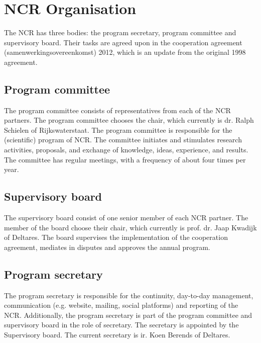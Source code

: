 \chapter{NCR Organisation}
	The NCR has three bodies: the program secretary, program committee and supervisory board. Their tasks are agreed upon in the cooperation agreement (samenwerkingsovereenkomst) 2012, which is an update from the original 1998 agreement. 
    
    \section{Program committee}
    The program committee consists of representatives from each of the NCR partners. The program committee chooses the chair, which currently is dr. Ralph Schielen of Rijkswaterstaat. The program committee is responsible for the (scientific) program of NCR. The committee initiates and stimulates research activities, proposals, and exchange of knowledge, ideas, experience, and results. The committee has regular meetings, with a frequency of about four times per year. 
    
    \section{Supervisory board}
    The supervisory board consist of one senior member of each NCR partner. The member of the board choose their chair, which currently is prof. dr. Jaap Kwadijk of Deltares. The board supervises the implementation of the cooperation agreement, mediates in disputes and approves the annual program. 
    
    \section{Program secretary}
    The program secretary is responsible for the continuity,  day-to-day management, communication (e.g. website, mailing, social platforms) and reporting of the NCR. Additionally, the program secretary is part of the program committee and supervisory board in the role of secretary. The secretary is appointed by the Supervisory board. The current secretary is ir. Koen Berends of Deltares. 

